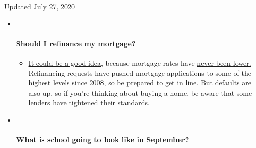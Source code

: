 Updated July 27, 2020

\begin{itemize}
\item ~
  \hypertarget{should-i-refinance-my-mortgage}{%
  \paragraph{Should I refinance my
  mortgage?}\label{should-i-refinance-my-mortgage}}

  \begin{itemize}
  \tightlist
  \item
    \href{https://www.nytimes3xbfgragh.onion/article/coronavirus-money-unemployment.html?action=click\&pgtype=Article\&state=default\&region=MAIN_CONTENT_3\&context=storylines_faq}{It
    could be a good idea,} because mortgage rates have
    \href{https://www.nytimes3xbfgragh.onion/2020/07/16/business/mortgage-rates-below-3-percent.html?action=click\&pgtype=Article\&state=default\&region=MAIN_CONTENT_3\&context=storylines_faq}{never
    been lower.} Refinancing requests have pushed mortgage applications
    to some of the highest levels since 2008, so be prepared to get in
    line. But defaults are also up, so if you're thinking about buying a
    home, be aware that some lenders have tightened their standards.
  \end{itemize}
\item ~
  \hypertarget{what-is-school-going-to-look-like-in-september}{%
  \paragraph{What is school going to look like in
  September?}\label{what-is-school-going-to-look-like-in-september}}


\end{itemize}
